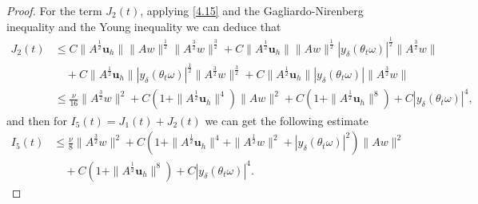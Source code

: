 \documentclass[10pt,a4paper]{amsart}
\begin{document}
\begin{proof}
For   the term $J_2(t)$, applying \eqref{4.15} and the Gagliardo-Nirenberg inequality and the Young inequality we can deduce that
\begin{align}
J_2(t)
&\leq C\|A^{\frac12}\textbf{u}_h\|\|Aw\|^\frac12\|A^{\frac32}w\|^\frac 32 +C\|A^{\frac12}\textbf{u}_h\|\|Aw\|^\frac12|y_\delta(\theta_t\omega)|^\frac12\|A^\frac32w\|
 \nonumber\\
&\quad+C\|A^{\frac12}\textbf{u}_h\| |y_\delta(\theta_t\omega)|^\frac12\|A^{\frac32}w\|^\frac 32
+C\|A^{\frac12}\textbf{u}_h\| |y_\delta(\theta_t\omega)|  \|A^\frac32w\|\nonumber\\
&\leq \frac \nu {16}\|A^\frac32w\|^2+C\left (1+\|A^\frac12\textbf{u}_h\|^4\right )\|Aw\|^2+C\left (1+\|A^\frac12\textbf{u}_h\|^8 \right)  +C |y_\delta(\theta_t\omega)|^4, \nonumber
\end{align}
and then  for $I_{5} (t)=J_1(t)+ J_2(t)$ we can get the following estimate
\begin{align}
I_{5}(t) &\leq  \frac \nu 8\|A^\frac32w\|^2
+C\left(1+ \|A^\frac12\textbf{u}_h\|^4+\|A^\frac12w\|^2+ |y_\delta(\theta_t\omega)|^2 \right)
\|Aw\|^2 \nonumber  \\
&\quad +C\left(1+\|A^\frac12\textbf{u}_h\|^8 \right)
+C  |y_\delta(\theta_t\omega)|^4. \label{sep6.2}
\end{align}



\end{proof}
\end{document}
